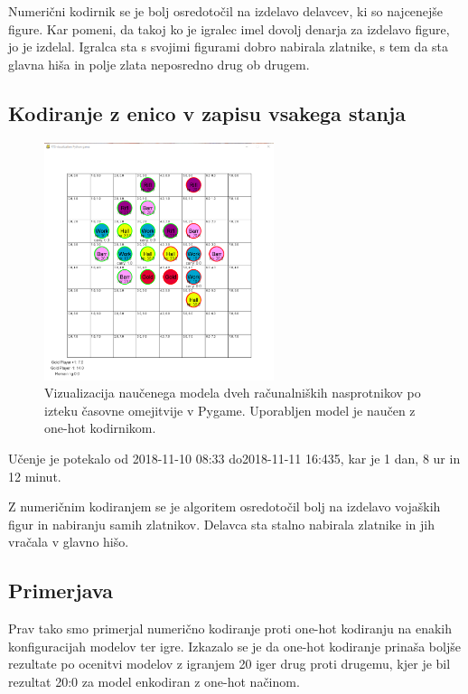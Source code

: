 \documentclass[a4paper, 12pt]{book}
\begin{document}
Numerični kodirnik se je bolj osredotočil na izdelavo delavcev, ki so najcenejše figure. 
Kar pomeni, da takoj ko je igralec imel dovolj denarja za izdelavo figure, jo je izdelal.
Igralca sta s svojimi figurami dobro nabirala zlatnike, s tem da sta glavna hiša in polje zlata neposredno drug ob drugem.


\subsection{Kodiranje z enico v zapisu vsakega stanja}

\begin{figure}[h]
	\begin{center}
		\includegraphics[width=0.6\textwidth]{photos/first-onehot.pdf}
	\end{center}
	\caption{Vizualizacija naučenega modela dveh računalniških nasprotnikov po izteku časovne omejitvije v Pygame. 
		Uporabljen model je naučen z one-hot kodirnikom.}
	\label{vizualizacijaRezultatovOneHotKodirnik100Timeout}
\end{figure}


Učenje je potekalo od 2018-11-10 08:33 do2018-11-11 16:435, kar je 1 dan, 8 ur in 12 minut.

Z numeričnim kodiranjem se je algoritem osredotočil bolj na izdelavo vojaških figur in nabiranju samih zlatnikov.
Delavca sta stalno nabirala zlatnike in jih vračala v glavno hišo.

\subsection{Primerjava}

Prav tako smo primerjal numerično kodiranje proti one-hot kodiranju na enakih konfiguracijah modelov ter igre.
Izkazalo se je da one-hot kodiranje prinaša boljše rezultate po ocenitvi modelov z igranjem 20 iger drug proti drugemu, kjer je bil rezultat 20:0 za model enkodiran z one-hot načinom.
\end{document}
